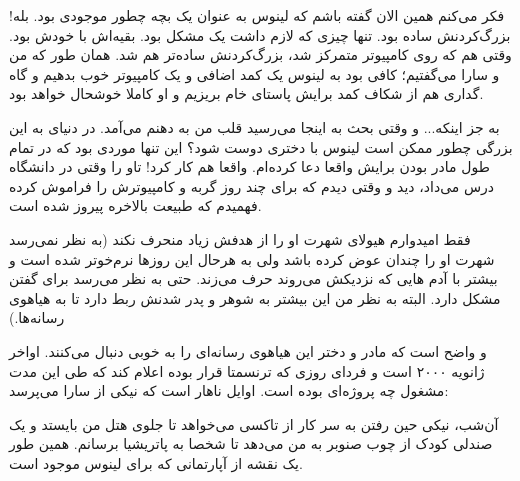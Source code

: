 \begin{journal}
فکر می‌کنم همین الان گفته باشم که لینوس به عنوان یک بچه چطور موجودی
بود. بله! بزرگ‌کردنش ساده بود. تنها چیزی که لازم داشت یک مشکل
بود. بقیه‌اش با خودش بود. وقتی هم که روی کامپیوتر متمرکز شد، بزرگ‌کردنش
ساده‌تر هم شد. همان طور که من و سارا می‌گفتیم؛ کافی بود به لینوس یک کمد
اضافی و یک کامپیوتر خوب بدهیم و گاه گداری هم از شکاف کمد برایش پاستای
خام بریزیم و او کاملا خوشحال خواهد بود.

به جز اینکه... و وقتی بحث به اینجا می‌رسید قلب من به دهنم می‌آمد. در
دنیای به این بزرگی چطور ممکن است لینوس با دختری دوست شود؟ این تنها
موردی بود که در تمام طول مادر بودن برایش واقعا دعا کرده‌ام. واقعا هم
کار کرد! تاو را وقتی در دانشگاه درس می‌داد، دید و وقتی دیدم که برای چند
روز گربه و کامپیوترش را فراموش کرده فهمیدم که طبیعت بالاخره پیروز شده
است.

فقط امیدوارم هیولای شهرت او را از هدفش زیاد منحرف نکند (به نظر نمی‌رسد
شهرت او را چندان عوض کرده باشد ولی به هرحال این روزها نرم‌خوتر شده است
و بیشتر با آدم هایی که نزدیکش می‌روند حرف می‌زند. حتی به نظر می‌رسد برای
 گفتن مشکل دارد. البته به نظر من این بیشتر به شوهر و پدر
شدنش ربط دارد تا به هیاهوی رسانه‌ها.)

و واضح است که مادر و دختر این هیاهوی رسانه‌ای را به خوبی دنبال
می‌کنند. اواخر ژانویه ۲۰۰۰ است و فردای روزی که ترنسمتا قرار بوده اعلام
کند که طی این مدت مشغول چه پروژه‌ای بوده است. اوایل ناهار است که نیکی
از سارا می‌پرسد: 

آن‌شب، نیکی حین رفتن به سر کار از تاکسی می‌خواهد تا جلوی هتل من بایستد و
یک صندلی کودک از چوب صنوبر به من می‌دهد تا شخصا به پاتریشیا
برسانم. همین طور یک نقشه از آپارتمانی که برای لینوس موجود است.
\end{journal}

